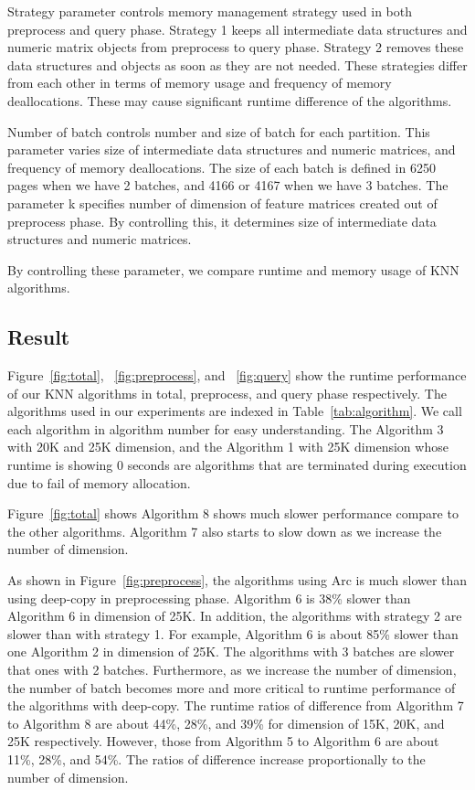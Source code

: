 Strategy parameter controls memory management strategy used in both preprocess and query phase.
Strategy 1 keeps all intermediate data structures and numeric matrix objects from preprocess to query phase. 
Strategy 2 removes these data structures and objects as soon as they are not needed. 
These strategies differ from each other in terms of memory usage and frequency of memory deallocations.
These may cause significant runtime difference of the algorithms.

Number of batch controls number and size of batch for each partition. This parameter varies size of intermediate data structures and numeric matrices, and 
frequency of memory deallocations. 
The size of each batch is defined in 6250 pages when we have 2 batches, and 4166 or 4167 when we have 3 batches. 
The parameter k specifies number of dimension of feature matrices created out of preprocess phase. 
By controlling this, it determines size of intermediate data structures and numeric matrices. 

By controlling these parameter, we compare runtime and memory usage of KNN algorithms. 


\subsection{Result}
\label{sec:history}
Figure~\ref{fig:total}, ~\ref{fig:preprocess}, and ~\ref{fig:query} show the runtime performance of our KNN algorithms in total, preprocess, and query phase respectively. 
The algorithms used in our experiments are indexed in Table~\ref{tab:algorithm}. We call each algorithm in algorithm number for easy understanding.
The Algorithm 3 with 20K and 25K dimension, and the Algorithm 1 with 25K dimension whose runtime is showing 0 seconds are algorithms that are terminated during execution due to fail of memory allocation.

Figure~\ref{fig:total} shows Algorithm 8 shows much slower performance compare to the other algorithms.
Algorithm 7 also starts to slow down as we increase the number of dimension.  

As shown in Figure~\ref{fig:preprocess}, the algorithms using Arc is much slower than using deep-copy in preprocessing phase. 
Algorithm 6 is 38\%  slower than Algorithm 6 in dimension of 25K. 
In addition, the algorithms with strategy 2 are slower than with strategy 1. 
For example, Algorithm 6 is about 85\% slower than one Algorithm 2 in dimension of 25K.
The algorithms with 3 batches are slower that ones with 2 batches. Furthermore, as we increase the number of dimension, the number of batch becomes more and more critical to runtime performance of the algorithms with deep-copy.
The runtime ratios of difference from Algorithm 7 to Algorithm 8 are about 44\%, 28\%, and 39\% for dimension of 15K, 20K, and 25K respectively. 
However, those from Algorithm 5 to Algorithm 6 are about 11\%, 28\%, and 54\%. The ratios of difference increase proportionally to the number of dimension. 

